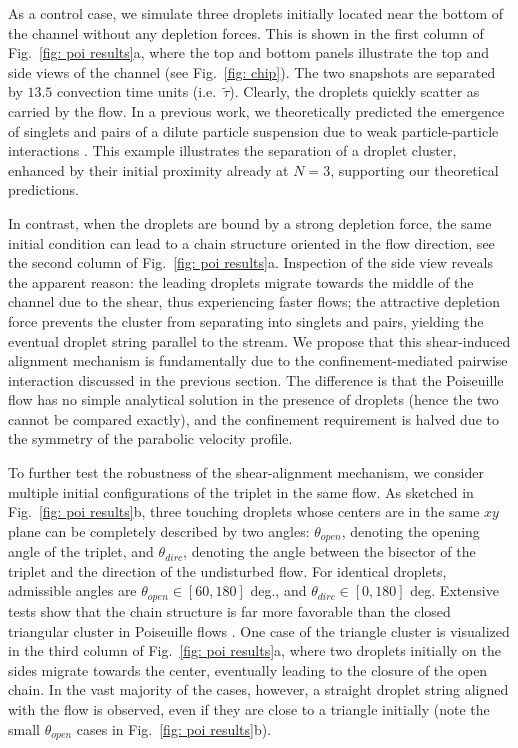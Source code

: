 As a control case, we simulate three droplets initially located near the bottom of the channel without any depletion forces. This is shown in the first column of Fig.\ \ref{fig: poi results}a, where the top and bottom panels illustrate the top and side views of the channel (see Fig.\ \ref{fig: chip}). The two snapshots are separated by $13.5$ convection time units (i.e.\ $\tilde{\tau}$). Clearly, the droplets quickly scatter as carried by the flow. In a previous work, we theoretically predicted the emergence of singlets and pairs of a dilute particle suspension due to weak particle-particle interactions \citep{Fouxon_2017}. This example illustrates the separation of a droplet cluster, enhanced by their initial proximity already at $N=3$, supporting our theoretical predictions.

In contrast, when the droplets are bound by a strong depletion force, the same initial condition can lead to a chain structure oriented in the flow direction, see the second column of Fig.\ \ref{fig: poi results}a. Inspection of the side view reveals the apparent reason: the leading droplets migrate towards the middle of the channel due to the shear, thus experiencing faster flows; the attractive depletion force prevents the cluster from separating into singlets and pairs, yielding the eventual droplet string parallel to the stream. We propose that this shear-induced alignment mechanism is fundamentally due to the confinement-mediated pairwise interaction discussed in the previous section. The difference is that the Poiseuille flow has no simple analytical solution in the presence of droplets (hence the two cannot be compared exactly), and the confinement requirement is halved due to the symmetry of the parabolic velocity profile.

To further test the robustness of the shear-alignment mechanism, we consider multiple initial configurations of the triplet in the same flow. As sketched in Fig.\ \ref{fig: poi results}b, three touching droplets whose centers are in the same $xy$ plane can be completely described by two angles: $\theta_{open}$, denoting the opening angle of the triplet, and $\theta_{dirc}$, denoting the angle between the bisector of the triplet and the direction of the undisturbed flow. For identical droplets, admissible angles are $\theta_{open} \in [60, 180]$ deg., and $\theta_{dirc} \in [0,180]$ deg. Extensive tests show that the chain structure is far more favorable than the closed triangular cluster in Poiseuille flows . One case of the triangle cluster is visualized in the third column of Fig.\ \ref{fig: poi results}a, where two droplets initially on the sides migrate towards the center, eventually leading to the closure of the open chain. In the vast majority of the cases, however, a straight droplet string aligned with the flow is observed, even if they are close to a triangle initially (note the small $\theta_{open}$ cases in Fig.\ \ref{fig: poi results}b).

